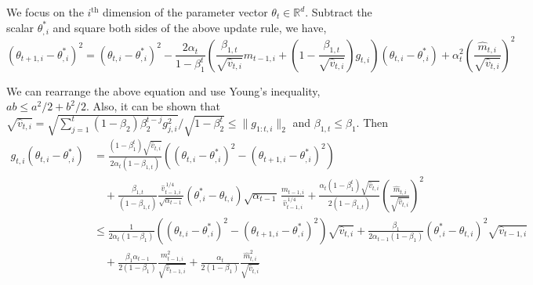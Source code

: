 \documentclass[11pt]{article}
\begin{document}
\noindent
We focus on the $i^\text{th}$ dimension of the parameter vector
$\theta_t \in \mathbb{R}^d$. Subtract the scalar $\theta^*_{,i}$
and square both sides of the above update rule, we have,
\[
(\theta_{t+1,i} - \theta^*_{,i})^2
 = (\theta_{t,i} - \theta^*_{,i})^2
 - \frac{2\alpha_t}{1 - \beta_1^t}\!\left(\frac{\beta_{1,t}}{\sqrt{\widehat{v}_{t,i}}} m_{t-1,i}
   + \left(1 - \frac{\beta_{1,t}}{\sqrt{\widehat{v}_{t,i}}}\right) g_{t,i}\right)\!(\theta_{t,i} - \theta^*_{,i})
 + \alpha_t^2\!\left(\frac{\widehat{m}_{t,i}}{\sqrt{\widehat{v}_{t,i}}}\right)^{\!2}
\]

\noindent
We can rearrange the above equation and use Young's inequality,
$ab \leq a^2/2 + b^2/2$. Also, it can be shown that
$\sqrt{\widehat{v}_{t,i}} = \sqrt{\sum_{j=1}^{t}(1-\beta_2)\beta_2^{t-j} g_{j,i}^2} / \sqrt{1 - \beta_2^t}
 \leq \|g_{1:t,i}\|_2$
and $\beta_{1,t} \leq \beta_1$. Then
\begin{align*}
g_{t,i}(\theta_{t,i} - \theta^*_{,i})
 &= \frac{(1 - \beta_1^t)\sqrt{\widehat{v}_{t,i}}}{2\alpha_t(1 - \beta_{1,t})}
    \left((\theta_{t,i} - \theta^*_{,i})^2 - (\theta_{t+1,i} - \theta^*_{,i})^2\right) \\
 &\quad + \frac{\beta_{1,t}}{(1 - \beta_{1,t})}
          \frac{\widehat{v}_{t-1,i}^{\,1/4}}{\sqrt{\alpha_{t-1}}}
          (\theta^*_{,i} - \theta_{t,i})
          \sqrt{\alpha_{t-1}}\,\frac{m_{t-1,i}}{\widehat{v}_{t-1,i}^{\,1/4}}
          + \frac{\alpha_t(1 - \beta_1^t)\sqrt{\widehat{v}_{t,i}}}{2(1 - \beta_{1,t})}
            \left(\frac{\widehat{m}_{t,i}}{\sqrt{\widehat{v}_{t,i}}}\right)^{\!2} \\
 &\leq \frac{1}{2\alpha_t(1 - \beta_1)}
       \left((\theta_{t,i} - \theta^*_{,i})^2 - (\theta_{t+1,i} - \theta^*_{,i})^2\right)\sqrt{\widehat{v}_{t,i}}
     + \frac{\beta_1}{2\alpha_{t-1}(1 - \beta_1)}(\theta^*_{,i} - \theta_{t,i})^2\sqrt{\widehat{v}_{t-1,i}} \\
 &\quad + \frac{\beta_1\alpha_{t-1}}{2(1 - \beta_1)}
          \frac{m_{t-1,i}^2}{\sqrt{\widehat{v}_{t-1,i}}}
        + \frac{\alpha_t}{2(1 - \beta_1)}
          \frac{\widehat{m}_{t,i}^2}{\sqrt{\widehat{v}_{t,i}}}
\end{align*}
\end{document}
